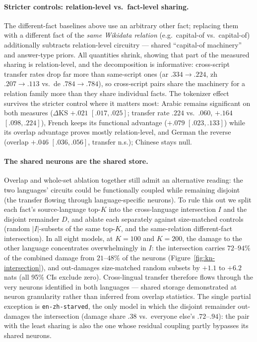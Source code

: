 \paragraph{Stricter controls: relation-level vs.\ fact-level sharing.}
The different-fact baselines above use an arbitrary other fact; replacing
them with a different fact of the \emph{same Wikidata relation} (e.g.\
capital-of vs.\ capital-of) additionally subtracts relation-level circuitry
--- shared ``capital-of machinery'' and answer-type priors. All quantities
shrink, showing that part of the measured sharing is relation-level, and the
decomposition is informative: cross-script transfer rates drop far more than
same-script ones (ar $.334 \to .224$, zh $.207 \to .113$ vs.\ de
$.784 \to .784$), so cross-script pairs share the machinery for a relation
family more than they share individual facts. The tokenizer effect survives
the stricter control where it matters most: Arabic remains significant on
both measures ($\Delta$KS $+.021$ $[.017, .025]$; transfer rate $.224$ vs.\
$.060$, $+.164$ $[.098, .224]$), French keeps its functional advantage
($+.079$ $[.023, .133]$) while its overlap advantage proves mostly
relation-level, and German the reverse (overlap $+.046$ $[.036, .056]$,
transfer n.s.); Chinese stays null.

\paragraph{The shared neurons are the shared store.}
Overlap and whole-set ablation together still admit an alternative reading:
the two languages' circuits could be functionally coupled while remaining
disjoint (the transfer flowing through language-specific neurons). To rule
this out we split each fact's source-language top-$K$ into the
cross-language intersection $I$ and the disjoint remainder $D$, and ablate
each separately against size-matched controls (random $|I|$-subsets of the
same top-$K$, and the same-relation different-fact intersection). In all
eight models, at $K{=}100$ and $K{=}200$, the damage to the other language
concentrates overwhelmingly in $I$: the intersection carries $72$--$94\%$ of
the combined damage from $21$--$48\%$ of the neurons
(Figure~\ref{fig:kn-intersection}), and out-damages size-matched random
subsets by $+1.1$ to $+6.2$ nats (all 95\% CIs exclude zero). Cross-lingual
transfer therefore flows through the very neurons identified in both
languages --- shared storage demonstrated at neuron granularity rather than
inferred from overlap statistics. The single partial exception is
\texttt{en-zh-starved}, the only model in which the disjoint remainder
out-damages the intersection (damage share $.38$ vs.\ everyone else's
$.72$--$.94$): the pair with the least sharing is also the one whose residual
coupling partly bypasses its shared neurons.

